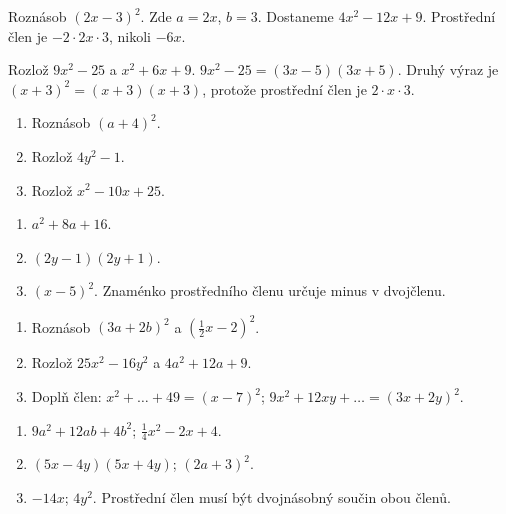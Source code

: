 \documentclass[11pt,a4paper]{article}
\begin{document}


\begin{prikladReseniBox}[title={Příklad 1},breakable=false]
Roznásob $(2x-3)^2$.
\tcblower
Zde $a=2x$, $b=3$. Dostaneme $4x^2-12x+9$. Prostřední člen je $-2\cdot2x\cdot3$, nikoli $-6x$.
\end{prikladReseniBox}


\begin{prikladReseniBox}[title={Příklad 2},breakable=false]
Rozlož $9x^2-25$ a $x^2+6x+9$.
\tcblower
$9x^2-25=(3x-5)(3x+5)$. Druhý výraz je $(x+3)^2=(x+3)(x+3)$, protože prostřední člen je $2\cdot x\cdot3$.
\end{prikladReseniBox}



\begin{zadaniReseniBox}[title={Procvičení},breakable=false]
\begin{enumerate}[label=\alph*)]
\item Roznásob $(a+4)^2$.
\item Rozlož $4y^2-1$.
\item Rozlož $x^2-10x+25$.
\end{enumerate}
\tcblower
\begin{enumerate}[label=\alph*)]
\item $a^2+8a+16$.
\item $(2y-1)(2y+1)$.
\item $(x-5)^2$. Znaménko prostředního členu určuje minus v dvojčlenu.
\end{enumerate}
\end{zadaniReseniBox}





\begin{zadaniReseniBox}[title={Základ: vzorce oběma směry},breakable=false]
\begin{enumerate}[label=\alph*)]
\item Roznásob $(3a+2b)^2$ a $(\frac12x-2)^2$.
\item Rozlož $25x^2-16y^2$ a $4a^2+12a+9$.
\item Doplň člen: $x^2+\ldots+49=(x-7)^2$; $9x^2+12xy+\ldots=(3x+2y)^2$.
\end{enumerate}
\tcblower
\begin{enumerate}[label=\alph*)]
\item $9a^2+12ab+4b^2$; $\frac14x^2-2x+4$.
\item $(5x-4y)(5x+4y)$; $(2a+3)^2$.
\item $-14x$; $4y^2$. Prostřední člen musí být dvojnásobný součin obou členů.
\end{enumerate}
\end{zadaniReseniBox}
\end{document}
